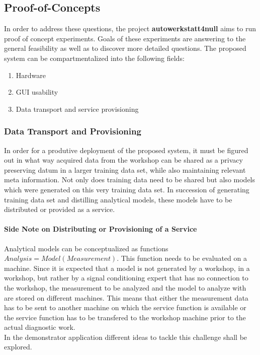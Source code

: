 \subsection{Proof-of-Concepts}
In order to address these questions, the project \textbf{autowerkstatt4null} aims to run proof of concept experiments.
Goals of these experiments are answering to the general feasibility as well as to discover more detailed questions.
The proposed system can be compartmentalized into the following fields:
\begin{enumerate}
  \item Hardware
  \item GUI usability
  \item Data transport and service provisioning 
\end{enumerate}

\subsubsection{Data Transport and Provisioning}
In order for a produtive deployment of the proposed system, it must be figured out in what way acquired data from the workshop can be shared as a privacy preserving datum in a larger training data set, while also maintaining relevant meta information.
Not only does training data need to be shared but also models which were generated on this very training data set.
In succession of generating training data set and distilling analytical models, these models have to be distributed or provided as a service.

\paragraph{Side Note on Distributing or Provisioning of a Service}
Analytical models can be conceptualized as functions $Analysis = Model(Measurement)$.
This function needs to be evaluated on a machine.
Since it is expected that a model is not generated by a workshop, in a workshop, but rather by a signal conditioning expert that has no connection to the workshop, the measurement to be analyzed and the model to analyze with are stored on different machines.
This means that either the measurement data has to be sent to another machine on which the service function is available or the service function has to be transfered to the workshop machine prior to the actual diagnostic work. \hfill \\
In the demonstrator application different ideas to tackle this challenge shall be explored. 

